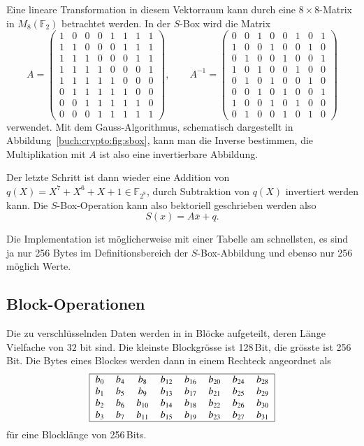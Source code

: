 Eine lineare Transformation in diesem Vektorraum kann durch eine
$8\times 8$-Matrix in $M_8(\mathbb{F}_2)$ betrachtet werden.
In der $S$-Box wird die Matrix
\[
A=
\begin{pmatrix}
1&0&0&0&1&1&1&1\\
1&1&0&0&0&1&1&1\\
1&1&1&0&0&0&1&1\\
1&1&1&1&0&0&0&1\\
1&1&1&1&1&0&0&0\\
0&1&1&1&1&1&0&0\\
0&0&1&1&1&1&1&0\\
0&0&0&1&1&1&1&1
\end{pmatrix},
\qquad
A^{-1}
=
\begin{pmatrix}
0&0&1&0&0&1&0&1\\
1&0&0&1&0&0&1&0\\
0&1&0&0&1&0&0&1\\
1&0&1&0&0&1&0&0\\
0&1&0&1&0&0&1&0\\
0&0&1&0&1&0&0&1\\
1&0&0&1&0&1&0&0\\
0&1&0&0&1&0&1&0
\end{pmatrix}
\]
verwendet.
Mit dem Gauss-Algorithmus, schematisch dargestellt in
Abbildung~\ref{buch:crypto:fig:sbox}, kann man die Inverse
bestimmen, die Multiplikation mit $A$ ist also eine invertierbare
Abbildung.

Der letzte Schritt ist dann wieder eine Addition von
$q(X)=X^7+X^6+X+1\in \mathbb{F}_{2^8}$, durch Subtraktion
von $q(X)$ invertiert werden kann.
Die $S$-Box-Operation kann also bektoriell geschrieben werden also
\[
	S(x) = A\overline{x}+q.
\]

Die Implementation ist möglicherweise mit einer Tabelle am schnellsten,
es sind ja nur 256 Bytes im Definitionsbereich der $S$-Box-Abbildung
und ebenso nur 256 möglich Werte.

\subsection{Block-Operationen
\label{buch:subsection:block-operationen}}
Die zu verschlüsselnden Daten werden in in Blöcke aufgeteilt, deren
Länge Vielfache von $32$ bit sind.
Die kleinste Blockgrösse ist 128\,Bit, die grösste ist 256\,Bit.
Die Bytes eines Blockes werden dann in einem Rechteck angeordnet
als
\begin{equation}
\begin{tabular}{|>{$}c<{$}>{$}c<{$}>{$}c<{$}>{$}c<{$}>{$}c<{$}>{$}c<{$}>{$}c<{$}>{$}c<{$}|}
\hline
 b_{0} & b_{4} & b_{8}  & b_{12} & b_{16} & b_{20} & b_{24} & b_{28} \\
 b_{1} & b_{5} & b_{9}  & b_{13} & b_{17} & b_{21} & b_{25} & b_{29} \\
 b_{2} & b_{6} & b_{10} & b_{14} & b_{18} & b_{22} & b_{26} & b_{30} \\
 b_{3} & b_{7} & b_{11} & b_{15} & b_{19} & b_{23} & b_{27} & b_{31} \\
\hline
\end{tabular}
\label{buch:crypto:eqn:block}
\end{equation}
für eine Blocklänge von 256\,Bits.



